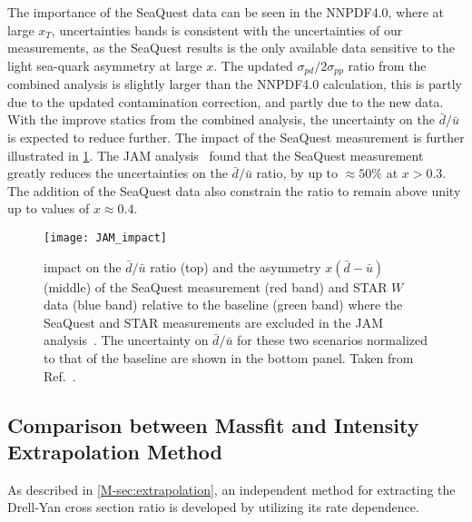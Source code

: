 \documentclass[../main.tex]{subfiles}
\begin{document}
The importance of the SeaQuest data can be seen in the NNPDF4.0, where at large $x_T$,
uncertainties bands is consistent with the uncertainties of our measurements, as the SeaQuest
results is the only available data sensitive to the light sea-quark asymmetry at large $x$.
The updated $\sigma_{pd}/2\sigma_{pp}$ ratio from the combined analysis is slightly larger than the NNPDF4.0
calculation, this is partly due to the updated contamination correction, and partly due to the new data.
With the improve statics from the combined analysis, the uncertainty on the $\bar{d}/\bar{u}$ is expected
to reduce further.
The impact of the SeaQuest measurement is further illustrated in \cref{fig:JAM_impact}. 
The JAM analysis~\cite{cocuzza2021} found that the SeaQuest measurement greatly reduces the 
uncertainties on the $\bar{d}/\bar{u}$ ratio, by up to $\approx 50\%$ at $x>0.3$. 
The addition of the SeaQuest data also constrain the ratio to remain above unity up to values of $x\approx0.4$.
\begin{figure}[h!]
	\centering
	\texttt{[image: JAM\_impact]}
	\caption{impact on the $\bar{d}/\bar{u}$ ratio (top) and the asymmetry $x\left(\bar{d}-\bar{u}\right)$ (middle)
		of the SeaQuest measurement (red band) and STAR $W$ data \cite{adam2021} (blue band) relative to the baseline (green band) 
		where the SeaQuest and STAR measurements are excluded in the JAM analysis~\cite{cocuzza2021}.
		The uncertainty on $\bar{d}/\bar{u}$ for these two scenarios normalized to that of the baseline
		are shown in the bottom panel. Taken from Ref.~\cite{cocuzza2021}.}
	\label{fig:JAM_impact}
\end{figure}

\subsection{Comparison between Massfit and Intensity Extrapolation Method}
As described in \cref{M-sec:extrapolation}, an independent method for extracting the Drell-Yan cross section
ratio is developed by utilizing its rate dependence. 
\end{document}
